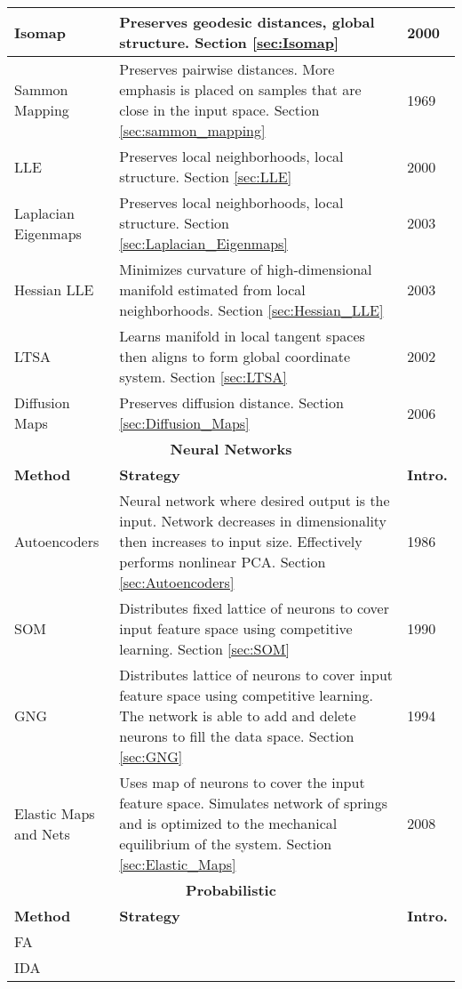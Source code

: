 \begin{longtable}{ |p{}|p{}|p{}| }
	\hline
	Isomap  & Preserves geodesic distances, global structure.  Section \ref{sec:Isomap}  & 2000 \\
	\hline
	Sammon Mapping  & Preserves pairwise distances.  More emphasis is placed on samples that are close in the input space.  Section \ref{sec:sammon_mapping} & 1969 \\
	\hline
	LLE  & Preserves local neighborhoods, local structure. Section \ref{sec:LLE}  & 2000 \\
	\hline
	Laplacian Eigenmaps  & Preserves local neighborhoods, local structure.  Section \ref{sec:Laplacian_Eigenmaps}  & 2003 \\
	\hline
	Hessian LLE  & Minimizes curvature of high-dimensional manifold estimated from local neighborhoods. Section \ref{sec:Hessian_LLE} & 2003 \\
	\hline
	LTSA  &  Learns manifold in local tangent spaces then aligns to form global coordinate system.  Section \ref{sec:LTSA} & 2002\\
	\hline
	Diffusion Maps  & Preserves diffusion distance.  Section \ref{sec:Diffusion_Maps}  & 2006\\
	\hline
	\multicolumn{3}{|c|}{\textbf{Neural Networks}} \\
	\hline
	\textbf{Method} & \textbf{Strategy} & \textbf{Intro.}\\
	\hline
	Autoencoders  & Neural network where desired output is the input.  Network decreases in dimensionality then increases to input size.  Effectively performs nonlinear PCA. Section \ref{sec:Autoencoders}  & 1986 \\
	\hline
	SOM  & Distributes fixed lattice of neurons to cover input feature space using competitive learning. Section \ref{sec:SOM}   & 1990\\
	\hline
	GNG  & Distributes lattice of neurons to cover input feature space using competitive learning. The network is able to add and delete neurons to fill the data space. Section \ref{sec:GNG}& 1994\\
	\hline
	Elastic Maps and Nets  &  Uses map of neurons to cover the input feature space. Simulates network of springs and is optimized to the mechanical equilibrium of the system.  Section \ref{sec:Elastic_Maps}  & 2008 \\
	\hline
	\multicolumn{3}{|c|}{\textbf{Probabilistic}}\\
	\hline
	\textbf{Method} & \textbf{Strategy} & \textbf{Intro.}\\
	\hline
	FA  & ~   & ~\\
	\hline
	IDA  & ~  & ~\\

\end{longtable}
